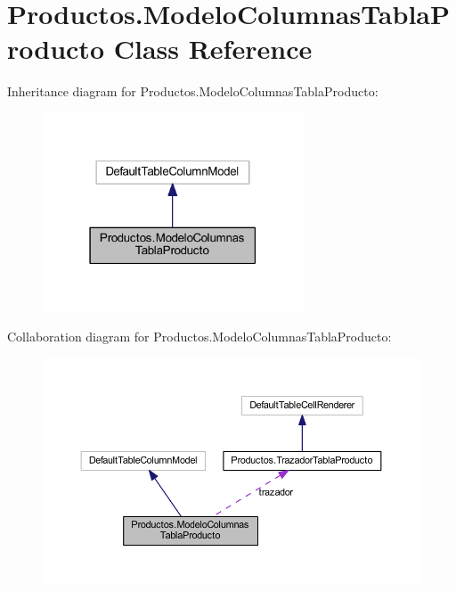 \hypertarget{class_productos_1_1_modelo_columnas_tabla_producto}{}\section{Productos.\+Modelo\+Columnas\+Tabla\+Producto Class Reference}
\label{class_productos_1_1_modelo_columnas_tabla_producto}


Inheritance diagram for Productos.\+Modelo\+Columnas\+Tabla\+Producto\+:
\nopagebreak
\begin{figure}[H]
\begin{center}
\leavevmode
\includegraphics[width=219pt]{class_productos_1_1_modelo_columnas_tabla_producto__inherit__graph}
\end{center}
\end{figure}


Collaboration diagram for Productos.\+Modelo\+Columnas\+Tabla\+Producto\+:
\nopagebreak
\begin{figure}[H]
\begin{center}
\leavevmode
\includegraphics[width=350pt]{class_productos_1_1_modelo_columnas_tabla_producto__coll__graph}
\end{center}
\end{figure}
